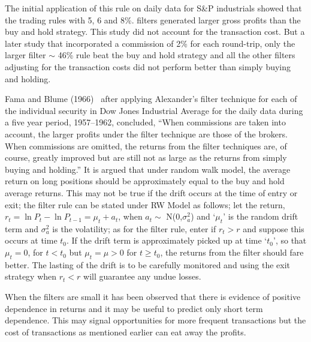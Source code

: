 The initial application of this rule on daily data for S\&P industrials showed that the trading rules with 5, 6 and 8\%. filters generated larger gross profits than the buy and hold strategy. This study did not account for the transaction cost. But a later study that incorporated a commission of 2\% for each round-trip, only the larger filter  $\sim$ 46\% rule beat the buy and hold strategy and all the other filters adjusting for the transaction costs did not perform better than simply buying and holding.


Fama and Blume (1966)~\cite{famablume} after applying Alexander's filter technique for each of the individual security in Dow Jones Industrial Average for the daily data during a five year period, 1957--1962, concluded, ``When commissions are taken into account, the larger profits under the filter technique are those of the brokers. When commissions are omitted, the returns from the filter techniques are, of course, greatly improved but are still not as large as the returns from simply buying and holding.'' It is argued that under random walk model, the average return on long positions should be approximately equal to the buy and hold average returns. This may not be true if the drift occurs at the time of entry or exit; the filter rule can be stated under RW Model as follows; let the return, $r_{t} = \ln{P_{t}} - \ln{P_{t-1}} = \mu_{t} + a_{t}$, when $a_{t} \sim$ N(0,$\sigma_{a}^2$) and `$\mu_{t}$' is the random drift term and $\sigma_{a}^2$ is the volatility; as for the filter rule, enter if $r_{t} > r$ and suppose this occurs at time $t_{0}$. If the drift term is approximately picked up at time `$t_{0}$', so that $\mu_{t} = 0$, for $t < t_{0}$ but $\mu_{t} = \mu > 0$ for $t \geq t_{0}$, the returns from the filter should fare better. The lasting of the drift is to be carefully monitored and using the exit strategy when $r_{t} < r$ will guarantee any undue losses.


When the filters are small it has been observed that there is evidence of positive dependence in returns and it may be useful to predict only short term dependence. This may signal opportunities for more frequent transactions but the cost of transactions as mentioned earlier can eat away the profits.


